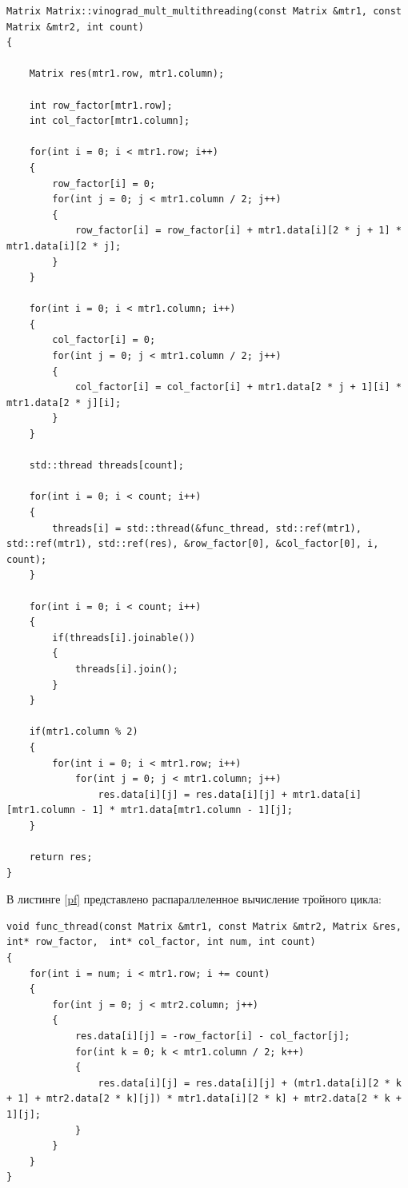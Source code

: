 \documentclass[12pt]{report}
\begin{document}
	\begin{lstlisting}[label=p,caption=Параллельный алгоритм Винограда]
Matrix Matrix::vinograd_mult_multithreading(const Matrix &mtr1, const Matrix &mtr2, int count)
{

    Matrix res(mtr1.row, mtr1.column);

    int row_factor[mtr1.row];
    int col_factor[mtr1.column];

    for(int i = 0; i < mtr1.row; i++)
    {
        row_factor[i] = 0;
        for(int j = 0; j < mtr1.column / 2; j++)
        {
            row_factor[i] = row_factor[i] + mtr1.data[i][2 * j + 1] * mtr1.data[i][2 * j];
        }
    }

    for(int i = 0; i < mtr1.column; i++)
    {
        col_factor[i] = 0;
        for(int j = 0; j < mtr1.column / 2; j++)
        {
            col_factor[i] = col_factor[i] + mtr1.data[2 * j + 1][i] * mtr1.data[2 * j][i];
        }
    }

    std::thread threads[count];

    for(int i = 0; i < count; i++)
    {
        threads[i] = std::thread(&func_thread, std::ref(mtr1), std::ref(mtr1), std::ref(res), &row_factor[0], &col_factor[0], i, count);
    }
    
    for(int i = 0; i < count; i++)
    {
        if(threads[i].joinable())
        {
            threads[i].join();
        }
    }

    if(mtr1.column % 2)
    {
        for(int i = 0; i < mtr1.row; i++)
            for(int j = 0; j < mtr1.column; j++)
                res.data[i][j] = res.data[i][j] + mtr1.data[i][mtr1.column - 1] * mtr1.data[mtr1.column - 1][j];
    }

    return res;
}
\end{lstlisting}

В листинге \ref{pf} представлено распараллеленное вычисление тройного цикла:

	\begin{lstlisting}[label=pf,caption=Распараллеленный тройной цикл]
void func_thread(const Matrix &mtr1, const Matrix &mtr2, Matrix &res,  int* row_factor,  int* col_factor, int num, int count)
{
    for(int i = num; i < mtr1.row; i += count)
    {
        for(int j = 0; j < mtr2.column; j++)
        {
            res.data[i][j] = -row_factor[i] - col_factor[j];
            for(int k = 0; k < mtr1.column / 2; k++)
            {
                res.data[i][j] = res.data[i][j] + (mtr1.data[i][2 * k + 1] + mtr2.data[2 * k][j]) * mtr1.data[i][2 * k] + mtr2.data[2 * k + 1][j];
            }
        }
    }
}
\end{lstlisting}
\end{document}
